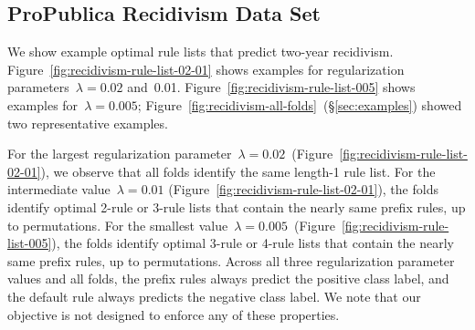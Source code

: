 \documentclass[twoside,11pt]{article}
\def\Reg{{\lambda}}
\begin{document}
\subsection{ProPublica Recidivism Data Set}
We show example optimal rule lists that predict two-year recidivism.
%
Figure~\ref{fig:recidivism-rule-list-02-01} shows examples for
regularization parameters~${\Reg = 0.02}$ and~0.01.
%
Figure~\ref{fig:recidivism-rule-list-005} shows examples for~${\Reg = 0.005}$;
Figure~\ref{fig:recidivism-all-folds}~(\S\ref{sec:examples}) showed two representative examples.

For the largest regularization parameter~${\Reg = 0.02}$~(Figure~\ref{fig:recidivism-rule-list-02-01}),
we observe that all folds identify the same length-1 rule list.
%
For the intermediate value~${\Reg = 0.01}$ (Figure~\ref{fig:recidivism-rule-list-02-01}),
the folds identify optimal 2-rule or 3-rule lists that contain the nearly same prefix rules,
up to permutations.
%
For the smallest value~${\Reg = 0.005}$~(Figure~\ref{fig:recidivism-rule-list-005}),
the folds identify optimal 3-rule or 4-rule lists that contain the nearly same prefix rules,
up to permutations.
%
Across all three regularization parameter values and all folds,
the prefix rules always predict the positive class label,
and the default rule always predicts the negative class label.
%
We note that our objective is not designed to enforce any of these properties.
\end{document}
